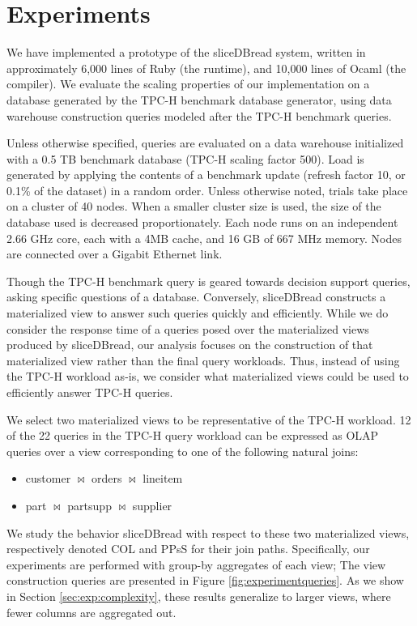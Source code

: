 
\section{Experiments}
\label{sec:experiments}

We have implemented a prototype of the sliceDBread system, written in approximately 6,000 lines of Ruby (the runtime), and 10,000 lines of Ocaml (the compiler).  We evaluate the scaling properties of our implementation on a database generated by the TPC-H benchmark database generator, using data warehouse construction queries modeled after the TPC-H benchmark queries.  

Unless otherwise specified, queries are evaluated on a data warehouse initialized with a 0.5 TB benchmark database (TPC-H scaling factor 500).  Load is generated by applying the contents of a benchmark update (refresh factor 10, or 0.1\% of the dataset) in a random order.  Unless otherwise noted, trials take place on a cluster of 40 nodes.  When a smaller cluster size is used, the size of the database used is decreased proportionately.  Each node runs on an independent 2.66 GHz core, each with a 4MB cache, and 16 GB of 667 MHz memory.  Nodes are connected over a Gigabit Ethernet link. 

Though the TPC-H benchmark query is geared towards decision support queries, asking specific questions of a database.  Conversely, sliceDBread constructs a materialized view to answer such queries quickly and efficiently.  While we do consider the response time of a queries posed over the materialized views produced by sliceDBread, our analysis focuses on the construction of that materialized view rather than the final query workloads.  Thus, instead of using the TPC-H workload as-is, we consider what materialized views could be used to efficiently answer TPC-H queries.

We select two materialized views to be representative of the TPC-H workload.  12 of the 22 queries in the TPC-H query workload can be expressed as OLAP queries over a view corresponding to one of the following natural joins:
\begin{itemize}
\item customer $\bowtie$ orders $\bowtie$ lineitem
\item part $\bowtie$ partsupp $\bowtie$ supplier
\end{itemize}
We study the behavior sliceDBread with respect to these two materialized views, respectively denoted COL and PPsS for their join paths.  Specifically, our experiments are performed with group-by aggregates of each view; The view construction queries are presented in Figure \ref{fig:experimentqueries}.  As we show in Section \ref{sec:exp:complexity}, these results generalize to larger views, where fewer columns are aggregated out.

